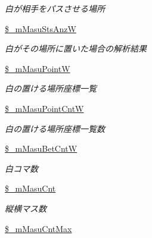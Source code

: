 \begin{DoxyCompactItemize}
\begin{DoxyCompactList}\small\item\em 白が相手をパスさせる場所 \end{DoxyCompactList}\item 
\hyperlink{class_reversi_a8654984ca1ca888a7e2b97e9a2d099aa}{\$\+\_\+m\+Masu\+Sts\+AnzW}\hypertarget{class_reversi_a8654984ca1ca888a7e2b97e9a2d099aa}{}\label{class_reversi_a8654984ca1ca888a7e2b97e9a2d099aa}

\begin{DoxyCompactList}\small\item\em 白がその場所に置いた場合の解析結果 \end{DoxyCompactList}\item 
\hyperlink{class_reversi_ac6007e0a7a850c31c37eb55ea74746a7}{\$\+\_\+m\+Masu\+PointW}\hypertarget{class_reversi_ac6007e0a7a850c31c37eb55ea74746a7}{}\label{class_reversi_ac6007e0a7a850c31c37eb55ea74746a7}

\begin{DoxyCompactList}\small\item\em 白の置ける場所座標一覧 \end{DoxyCompactList}\item 
\hyperlink{class_reversi_aad5f6baed07b96cd5d06e38fd66f1c36}{\$\+\_\+m\+Masu\+Point\+CntW}\hypertarget{class_reversi_aad5f6baed07b96cd5d06e38fd66f1c36}{}\label{class_reversi_aad5f6baed07b96cd5d06e38fd66f1c36}

\begin{DoxyCompactList}\small\item\em 白の置ける場所座標一覧数 \end{DoxyCompactList}\item 
\hyperlink{class_reversi_a92a21ca9d4bad37593fea8b3d2be6981}{\$\+\_\+m\+Masu\+Bet\+CntW}\hypertarget{class_reversi_a92a21ca9d4bad37593fea8b3d2be6981}{}\label{class_reversi_a92a21ca9d4bad37593fea8b3d2be6981}

\begin{DoxyCompactList}\small\item\em 白コマ数 \end{DoxyCompactList}\item 
\hyperlink{class_reversi_a8ac63bcef31cc4d29b244456c62677bc}{\$\+\_\+m\+Masu\+Cnt}\hypertarget{class_reversi_a8ac63bcef31cc4d29b244456c62677bc}{}\label{class_reversi_a8ac63bcef31cc4d29b244456c62677bc}

\begin{DoxyCompactList}\small\item\em 縦横マス数 \end{DoxyCompactList}\item 
\hyperlink{class_reversi_ae40f5163a8835d2ee564386a09ce196a}{\$\+\_\+m\+Masu\+Cnt\+Max}\hypertarget{class_reversi_ae40f5163a8835d2ee564386a09ce196a}{}\label{class_reversi_ae40f5163a8835d2ee564386a09ce196a}


\end{DoxyCompactItemize}
